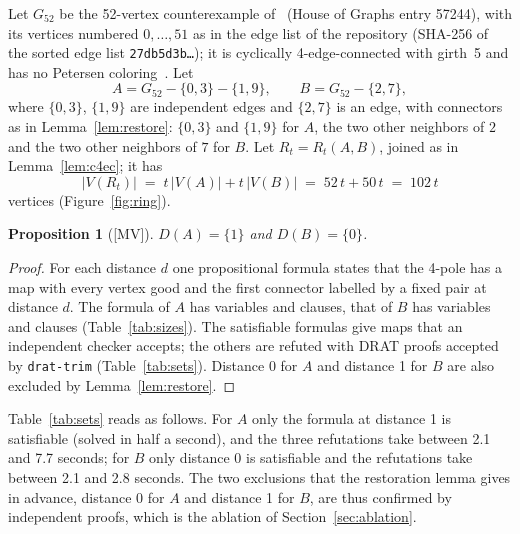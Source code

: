 \documentclass[11pt]{article}
\newtheorem{proposition}[theorem]{Proposition}
\theoremstyle{definition}
\theoremstyle{remark}
\newcommand{\Gfty}{G_{52}}
\newcommand{\claim}[1]{\textup{[#1]}}
\begin{document}
Let $\Gfty$ be the 52-vertex counterexample of~\cite{GJMMMU2026} (House of Graphs entry 57244), with
its vertices numbered $0, \dots, 51$ as in the edge list of the repository (SHA-256 of the sorted
edge list \texttt{27db5d3b\ldots}); it is cyclically 4-edge-connected with girth~5 and has no
Petersen coloring~\cite{GJMMMU2026, Audit2026}. Let
\begin{equation}\label{eq:blocks}
A = \Gfty - \{0,3\} - \{1,9\}, \qquad B = \Gfty - \{2, 7\},
\end{equation}
where $\{0, 3\}$, $\{1, 9\}$ are independent edges and $\{2, 7\}$ is an edge, with connectors as in
Lemma~\ref{lem:restore}: $\{0, 3\}$ and $\{1, 9\}$ for $A$, the two other neighbors of $2$ and the
two other neighbors of $7$ for $B$. Let $R_t = R_t(A, B)$, joined as in Lemma~\ref{lem:c4ec}; it has
\begin{equation}\label{eq:order}
|V(R_t)| \;=\; t\,|V(A)| + t\,|V(B)| \;=\; 52\,t + 50\,t \;=\; 102\,t
\end{equation}
vertices (Figure~\ref{fig:ring}).

\begin{proposition}[\claim{MV}]\label{prop:sets}
$D(A) = \{1\}$ and $D(B) = \{0\}$.
\end{proposition}

\begin{proof}
For each distance $d$ one propositional formula states that the 4-pole has a map with every vertex
good and the first connector labelled by a fixed pair at distance $d$. The formula of $A$ has
\nVarsA{} variables and \nClausesA{} clauses, that of $B$ has \nVarsB{} variables and \nClausesB{} clauses
(Table~\ref{tab:sizes}). The satisfiable formulas
give maps that an independent checker accepts; the others are refuted with DRAT proofs accepted by
\texttt{drat-trim} (Table~\ref{tab:sets}). Distance 0 for $A$ and distance 1 for $B$ are also
excluded by Lemma~\ref{lem:restore}.
\end{proof}



Table~\ref{tab:sets} reads as follows. For $A$ only the formula at distance 1 is satisfiable (solved in half a
second), and the three refutations take between 2.1 and 7.7 seconds; for $B$ only distance 0 is satisfiable
and the refutations take between 2.1 and 2.8 seconds. The two exclusions that the restoration lemma
gives in advance, distance 0 for $A$ and distance 1 for $B$, are thus confirmed by independent proofs,
which is the ablation of Section~\ref{sec:ablation}.
\end{document}
